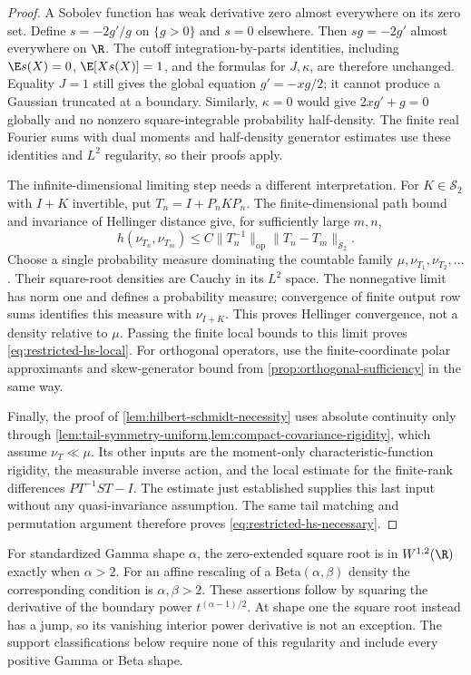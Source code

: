 \begin{proof}
A Sobolev function has weak derivative zero almost everywhere on its
zero set.
Define \(s=-2g'/g\) on \(\{g>0\}\) and \(s=0\) elsewhere.
Then \(sg=-2g'\) almost everywhere on \(\R\).
The cutoff integration-by-parts identities, including
\(\E s(X)=0\), \(\E[Xs(X)]=1\), and the formulas for \(J,\kappa\), are
therefore unchanged.
Equality \(J=1\) still gives the global equation \(g'=-xg/2\);
it cannot produce a Gaussian truncated at a boundary.
Similarly, \(\kappa=0\) would give \(2xg'+g=0\) globally and no
nonzero square-integrable probability half-density.
The finite real Fourier sums with dual moments and half-density generator estimates use
these identities and \(L^2\) regularity, so their proofs apply.

The infinite-dimensional limiting step needs a different interpretation.
For \(K\in\mathcal S_2\) with \(I+K\) invertible, put
\(T_n=I+P_nKP_n\).
The finite-dimensional path bound and invariance of Hellinger distance
give, for sufficiently large \(m,n\),
\[
 h(\nu_{T_n},\nu_{T_m})
 \leq C\|T_n^{-1}\|_{\mathrm{op}}
                 \|T_n-T_m\|_{\mathcal S_2}.
\]
Choose a single probability measure dominating the countable family
\(\mu,\nu_{T_1},\nu_{T_2},\ldots\).
Their square-root densities are Cauchy in its \(L^2\) space.
The nonnegative limit has norm one and defines a probability measure;
convergence of finite output row sums identifies this measure with
\(\nu_{I+K}\).
This proves Hellinger convergence, not a density relative to \(\mu\).
Passing the finite local bounds to this limit proves
\eqref{eq:restricted-hs-local}.
For orthogonal operators, use the finite-coordinate polar
approximants and skew-generator bound from
\cref{prop:orthogonal-sufficiency} in the same way.

Finally, the proof of \cref{lem:hilbert-schmidt-necessity} uses absolute
continuity only through
\cref{lem:tail-symmetry-uniform,lem:compact-covariance-rigidity},
which assume \(\nu_T\ll\mu\).
Its other inputs are the moment-only characteristic-function rigidity,
the measurable inverse action, and the local estimate for the
finite-rank differences \(PT^{-1}ST-I\).
The estimate just established supplies this last input without any
quasi-invariance assumption.
The same tail matching and permutation argument therefore proves
\eqref{eq:restricted-hs-necessary}.
\end{proof}

For standardized Gamma shape \(\alpha\), the zero-extended square
root is in \(W^{1,2}(\R)\) exactly when \(\alpha>2\).
For an affine rescaling of a Beta\((\alpha,\beta)\) density the
corresponding condition is \(\alpha,\beta>2\).
These assertions follow by squaring the derivative of the boundary
power \(t^{(\alpha-1)/2}\).
At shape one the square root instead has a jump, so its vanishing
interior power derivative is not an exception.
The support classifications below require none of this regularity
and include every positive Gamma or Beta shape.


